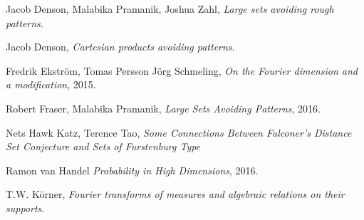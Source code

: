 \documentclass[12pt,reqno]{article}
\numberwithin{equation}{section}
\numberwithin{theorem}{section}
\begin{document}
\begin{thebibliography}{9}

    Jacob Denson, Malabika Pramanik, Joshua Zahl,
    \textit{Large sets avoiding rough patterns}.

    Jacob Denson,
    \textit{Cartesian products avoiding patterns}.

    Fredrik Ekstr\"{o}m, Tomas Persson J\"{o}rg Schmeling,
    \textit{On the {F}ourier dimension and a modification},
    2015.

    Robert Fraser, Malabika Pramanik,
    \textit{Large Sets Avoiding Patterns},
    2016.

    Nets Hawk Katz, Terence Tao,
    \textit{Some Connections Between {F}alconer's Distance Set Conjecture and Sets of {F}urstenburg Type}

    Ramon van Handel
    \textit{Probability in High Dimensions},
    2016.


    T.W. K\"{o}rner,
    \textit{{F}ourier transforms of measures and algebraic relations on their supports}.


\end{thebibliography}




\end{document}
